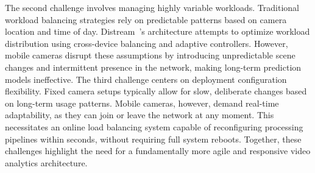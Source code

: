 The second challenge involves managing highly variable workloads. Traditional workload balancing strategies rely on predictable patterns based on camera location and time of day. Distream~\cite{zeng2020distream}'s architecture attempts to optimize workload distribution using cross-device balancing and adaptive controllers. However, mobile cameras disrupt these assumptions by introducing unpredictable scene changes and intermittent presence in the network, making long-term prediction models ineffective. The third challenge centers on deployment configuration flexibility. Fixed camera setups typically allow for slow, deliberate changes based on long-term usage patterns. Mobile cameras, however, demand real-time adaptability, as they can join or leave the network at any moment. This necessitates an online load balancing system capable of reconfiguring processing pipelines within seconds, without requiring full system reboots. Together, these challenges highlight the need for a fundamentally more agile and responsive video analytics architecture.




